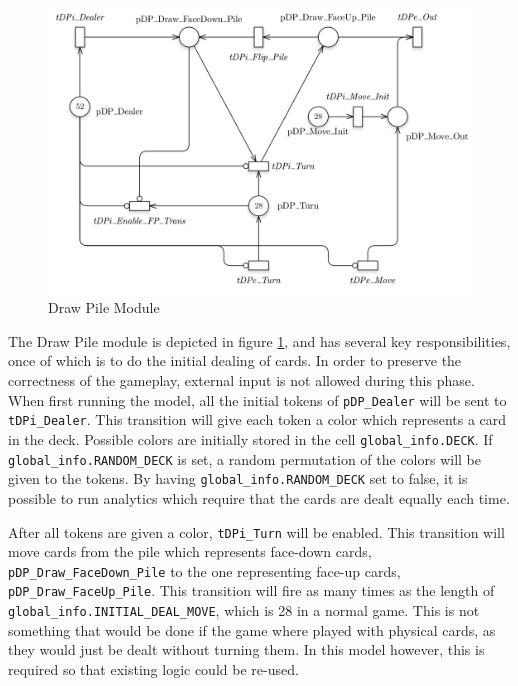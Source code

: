 \documentclass[runningheads,a4paper]{llncs}
\begin{document}
\begin{figure}
	\begin{center}
		\includegraphics[width=\textwidth]{images/drawPile}
		\caption{Draw Pile Module}
		\label{fig:draw_pile}
	\end{center}
\end{figure}
The Draw Pile module is depicted in figure \ref{fig:draw_pile}, and has several key responsibilities, once of which is to do the initial dealing of cards. In order to preserve the correctness of the gameplay, external input is not allowed during this phase. When first running the model, all the initial tokens of \verb!pDP_Dealer! will be sent to \verb!tDPi_Dealer!. This transition will give each token a color which represents a card in the deck. Possible colors are initially stored in the cell \verb!global_info.DECK!. If \verb!global_info.RANDOM_DECK! is set, a random permutation of the colors will be given to the tokens. By having \verb!global_info.RANDOM_DECK! set to false, it is possible to run analytics which require that the cards are dealt equally each time.
\newline

After all tokens are given a color, \verb!tDPi_Turn! will be enabled. This transition will move cards from the pile which represents face-down cards, \verb!pDP_Draw_FaceDown_Pile! to the one representing face-up cards, \verb!pDP_Draw_FaceUp_Pile!. This transition will fire as many times as the length of \verb!global_info.INITIAL_DEAL_MOVE!, which is 28 in a normal game. This is not something that would be done if the game where played with physical cards, as they would just be dealt without turning them. In this model however, this is required so that existing logic could be re-used.
\newline
\end{document}
